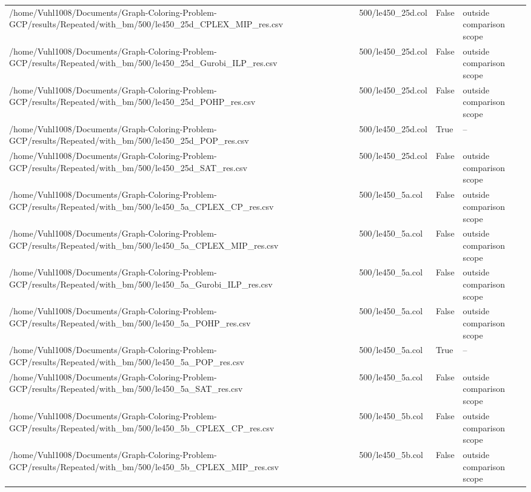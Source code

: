 \begin{table}[htbp]
\begin{tabular}{llll}
/home/Vuhl1008/Documents/Graph-Coloring-Problem-GCP/results/Repeated/with\_bm/500/le450\_25d\_CPLEX\_MIP\_res.csv & 500/le450\_25d.col & False & outside comparison scope \\
/home/Vuhl1008/Documents/Graph-Coloring-Problem-GCP/results/Repeated/with\_bm/500/le450\_25d\_Gurobi\_ILP\_res.csv & 500/le450\_25d.col & False & outside comparison scope \\
/home/Vuhl1008/Documents/Graph-Coloring-Problem-GCP/results/Repeated/with\_bm/500/le450\_25d\_POHP\_res.csv & 500/le450\_25d.col & False & outside comparison scope \\
/home/Vuhl1008/Documents/Graph-Coloring-Problem-GCP/results/Repeated/with\_bm/500/le450\_25d\_POP\_res.csv & 500/le450\_25d.col & True & -- \\
/home/Vuhl1008/Documents/Graph-Coloring-Problem-GCP/results/Repeated/with\_bm/500/le450\_25d\_SAT\_res.csv & 500/le450\_25d.col & False & outside comparison scope \\
/home/Vuhl1008/Documents/Graph-Coloring-Problem-GCP/results/Repeated/with\_bm/500/le450\_5a\_CPLEX\_CP\_res.csv & 500/le450\_5a.col & False & outside comparison scope \\
/home/Vuhl1008/Documents/Graph-Coloring-Problem-GCP/results/Repeated/with\_bm/500/le450\_5a\_CPLEX\_MIP\_res.csv & 500/le450\_5a.col & False & outside comparison scope \\
/home/Vuhl1008/Documents/Graph-Coloring-Problem-GCP/results/Repeated/with\_bm/500/le450\_5a\_Gurobi\_ILP\_res.csv & 500/le450\_5a.col & False & outside comparison scope \\
/home/Vuhl1008/Documents/Graph-Coloring-Problem-GCP/results/Repeated/with\_bm/500/le450\_5a\_POHP\_res.csv & 500/le450\_5a.col & False & outside comparison scope \\
/home/Vuhl1008/Documents/Graph-Coloring-Problem-GCP/results/Repeated/with\_bm/500/le450\_5a\_POP\_res.csv & 500/le450\_5a.col & True & -- \\
/home/Vuhl1008/Documents/Graph-Coloring-Problem-GCP/results/Repeated/with\_bm/500/le450\_5a\_SAT\_res.csv & 500/le450\_5a.col & False & outside comparison scope \\
/home/Vuhl1008/Documents/Graph-Coloring-Problem-GCP/results/Repeated/with\_bm/500/le450\_5b\_CPLEX\_CP\_res.csv & 500/le450\_5b.col & False & outside comparison scope \\
/home/Vuhl1008/Documents/Graph-Coloring-Problem-GCP/results/Repeated/with\_bm/500/le450\_5b\_CPLEX\_MIP\_res.csv & 500/le450\_5b.col & False & outside comparison scope \\

\end{tabular}
\end{table}
